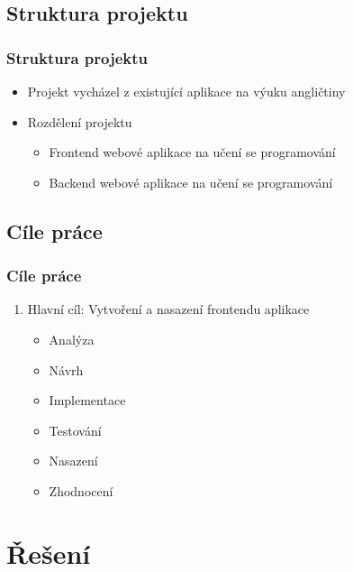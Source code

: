 \documentclass[a4paper]{beamer}
\begin{document}
\subsection*{Struktura projektu}
\begin{frame}
\frametitle{Struktura projektu}
\begin{itemize}
    \item Projekt vycházel z existující aplikace na výuku angličtiny
    \item Rozdělení projektu
    \begin{itemize}
        \item Frontend webové aplikace na učení se programování
        \item Backend webové aplikace na učení se programování
    \end{itemize}
\end{itemize}
\end{frame}

\subsection*{Cíle práce}
\begin{frame}
\frametitle{Cíle práce}
\begin{enumerate}
\item Hlavní cíl: Vytvoření a nasazení frontendu aplikace
    \begin{itemize}
        \item Analýza
        \item Návrh
        \item Implementace
        \item Testování
        \item Nasazení
        \item Zhodnocení
    \end{itemize}
\end{enumerate}
\end{frame}

\section{Řešení}
\end{document}
